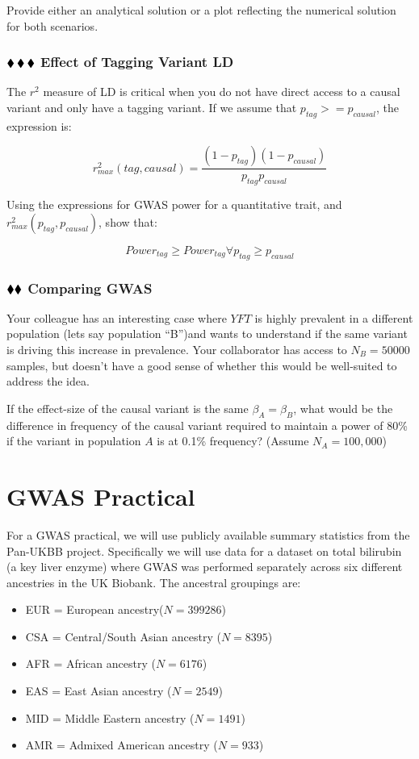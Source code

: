 \documentclass{pset}
\begin{document}
Provide either an analytical solution or a plot reflecting the numerical solution for both scenarios. 

\subsubsection*{$\mathbin{\blacklozenge}\mathbin{\blacklozenge}\mathbin{\blacklozenge}$  Effect of Tagging Variant LD}

The $r^2$ measure of LD is critical when you do not have direct access to a causal variant and only have a tagging variant. If we assume that $p_{tag} >= p_{causal}$, the expression is: 

$$r^2_{max}(tag, causal) = \frac{(1 - p_{tag})(1 - p_{causal})}{p_{tag}p_{causal}}$$

Using the expressions for GWAS power for a quantitative trait, and $r^2_{max}(p_{tag}, p_{causal})$, show that:

$$Power_{tag} \geq Power_{tag} \forall p_{tag} \geq p_{causal}$$

\subsubsection*{$\mathbin{\blacklozenge}\mathbin{\blacklozenge}$ Comparing GWAS}

Your colleague has an interesting case where $YFT$ is highly prevalent in a different population (lets say population ``B'')and wants to understand if the same variant is driving this increase in prevalence. Your collaborator has access to $N_B=50000$ samples, but doesn't have a good sense of whether this would be well-suited to address the idea.

If the effect-size of the causal variant is the same $\beta_A = \beta_B$, what would be the difference in frequency of the causal variant required to maintain a power of 80\% if the variant in population $A$ is at 0.1\% frequency? (Assume $N_A = 100,000$)  


\section*{GWAS Practical}

For a GWAS practical, we will use publicly available summary statistics from the Pan-UKBB project. Specifically we will use data for a dataset on total bilirubin (a key liver enzyme) where GWAS was performed separately across six different ancestries in the UK Biobank. The ancestral groupings are: 

\begin{itemize}
	\setlength{\itemsep}{0pt}
	\item EUR = European ancestry($N=399286$)
	\item CSA = Central/South Asian ancestry ($N=8395$)
	\item AFR = African ancestry ($N=6176$)
	\item EAS = East Asian ancestry ($N=2549$)
	\item MID = Middle Eastern ancestry ($N=1491$)
	\item AMR = Admixed American ancestry ($N=933$)
\end{itemize}
\end{document}
